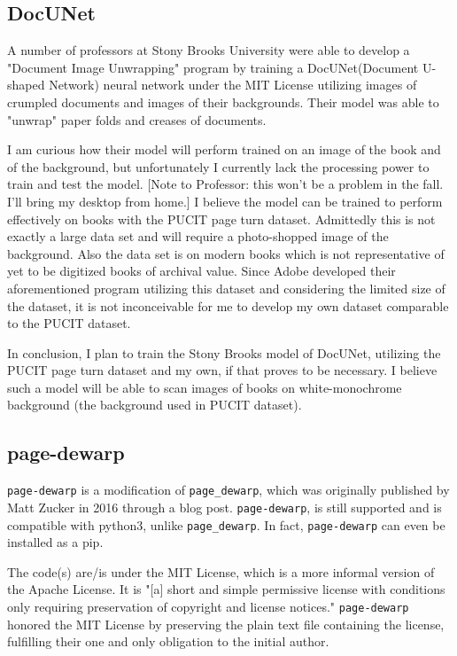 \documentclass[10pt,twocolumn]{article}
\begin{document}
\subsection{DocUNet}
A number of professors at Stony Brooks University were able to develop a "Document Image Unwrapping" program by training a DocUNet(Document U-shaped Network) neural network under the MIT License utilizing images of crumpled documents and images of their backgrounds\cite{ma2018}\cite{zhang2021}. Their model was able to "unwrap" paper folds and creases of documents.\newline 

I am curious how their model will perform trained on an image of the book and of the background, but unfortunately I currently lack the processing power to train and test the model. [Note to Professor: this won't be a problem in the fall. I'll bring my desktop from home.] I believe the model can be trained to perform effectively on books with the PUCIT page turn dataset\cite{wigington2024}.  Admittedly this is not exactly a large data set and will require a photo-shopped image of the background. Also the data set is on modern books which is not representative of yet to be digitized books of archival value. Since Adobe developed their aforementioned program utilizing this dataset and considering the limited size of the dataset, it is not inconceivable for me to develop my own dataset comparable to the PUCIT dataset.\newline

In conclusion, I plan to train the Stony Brooks model of DocUNet, utilizing the PUCIT page turn dataset and my own, if that proves to be necessary. I believe such a model will be able to scan images of books on white-monochrome background (the background used in PUCIT dataset).\newline

\subsection{page-dewarp}
\texttt{page-dewarp} is a modification of \texttt{page\_dewarp}, which was originally published by Matt Zucker in 2016 through a blog post\cite{}. \texttt{page-dewarp}, is still supported and is compatible with python3, unlike \texttt{page\_dewarp}. In fact, \texttt{page-dewarp} can even be installed as a pip.\newline

The code(s) are/is under the MIT License, which is a more informal version of the Apache License. It is "[a] short and simple permissive license with conditions only requiring preservation of copyright and license notices." \texttt{page-dewarp} honored the MIT License by preserving the plain text file containing the license, fulfilling their one and only obligation to the initial author.\newline
\end{document}
